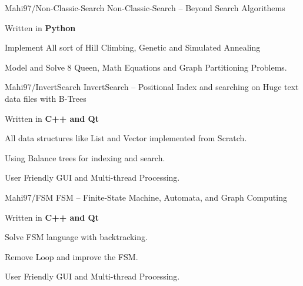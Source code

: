 \begin{cventries}
    
    \cventry
    {Mahi97/Non-Classic-Search} %
    {Non-Classic-Search -- Beyond Search Algorithems} %
    {} %
    {} %
    {
      \begin{cvitems} %
         \item {Written in \textbf{Python}}
        \item {Implement All sort of Hill Climbing, Genetic and Simulated Annealing}
        \item {Model and Solve 8 Queen, Math Equations and Graph Partitioning Problems.}
      \end{cvitems}
    }

    
    \cventry
    {Mahi97/InvertSearch} %
    {InvertSearch -- Positional Index and searching on Huge text data files with B-Trees} %
    {} %
    {} %
    {
      \begin{cvitems} %
        \item {Written in \textbf{C++ and Qt}}
        \item {All data structures like List and Vector implemented from Scratch.}
        \item {Using Balance trees for indexing and search.}
        \item {User Friendly GUI and Multi-thread Processing.}
      \end{cvitems}
    }
    
    \cventry
    {Mahi97/FSM} %
    {FSM -- Finite-State Machine, Automata, and Graph Computing} %
    {} %
    {} %
    {
      \begin{cvitems} %
        \item {Written in \textbf{C++ and Qt}}
        \item {Solve FSM language with backtracking.}
        \item {Remove Loop and improve the FSM.}
        \item {User Friendly GUI and Multi-thread Processing.}
      \end{cvitems}
    }

    


\end{cventries}
